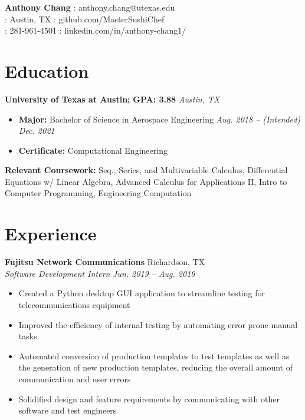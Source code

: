 \documentclass[letterpaper,11pt]{article}
\begin{document}
\textbf{\LARGE{Anthony Chang}} \hfill \faEnvelope: anthony.chang@utexas.edu\\
\faMapMarker: Austin, TX \hfill \faGithub: github.com/MasterSushiChef\\
\faPhone: 281-961-4501 \hfill \faLinkedinSquare: linkedin.com/in/anthony-chang1/

{
\section{Education}
\textbf{University of Texas at Austin;} \textbf{GPA: 3.88} \hfill \textit{Austin, TX}\\
\begin{itemize}[noitemsep, topsep=0pt, leftmargin=0.7cm]
  \item \textbf{\small{Major:}} Bachelor of Science in Aerospace Engineering \hfill \textit{Aug. 2018 -- (Intended) Dec. 2021}\\
  \item \textbf{\small{Certificate:}} Computational Engineering\\
\end{itemize}
\textbf{\small{Relevant Coursework:}} Seq., Series, and Multivariable Calculus, Differential Equations w/ Linear Algebra,
Advanced Calculus for Applications II, Intro to Computer Programming, Engineering Computation
}

\section{Experience}
\textbf{Fujitsu Network Communications} \hfill Richardson, TX\\
\textit{Software Development Intern} \hfill \textit{Jun. 2019 -- Aug. 2019}\\
\begin{itemize}[noitemsep, topsep=0pt, leftmargin=0.7cm]
  \item Created a Python desktop GUI application to streamline testing for telecommunications equipment
  \item Improved the efficiency of internal testing by automating error prone manual tasks
  \item Automated conversion of production templates to test templates as well as the generation of new production templates, reducing the overall amount of communication and user errors
  \item Solidified design and feature requirements by communicating with other software and test engineers
\end{itemize}
\end{document}
